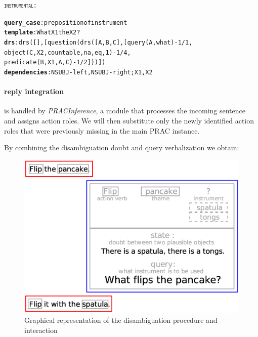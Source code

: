 \documentclass[oribibl]{llncs}
\begin{document}
\begin{alltt}
{\large \textsc{instrumental}}:

        \textbf{query_case}: preposition of instrument
        \textbf{template}: What X1 the X2?
        \textbf{drs}: drs([],[question(drs([A,B,C],[query(A,what)-1/1,
        object(C,X2,countable,na,eq,1)-1/4,
        predicate(B,X1,A,C)-1/2]))])
        \textbf{dependencies}: NSUBJ-left, NSUBJ-right; X1, X2
\end{alltt}




\paragraph{reply integration} is handled by \textit{PRACInference}, a module that processes the incoming sentence and assigns action roles. We will then substitute only the newly identified action roles that were previously missing in the main PRAC instance.

By combining the disambiguation doubt and query verbalization we obtain:
  \begin{figure}[H]
\includegraphics[scale=0.51, trim= 0mm 0mm 0mm 10mm]{results.eps}
\caption{Graphical representation of the disambiguation procedure and interaction}
\end{figure}
\end{document}
